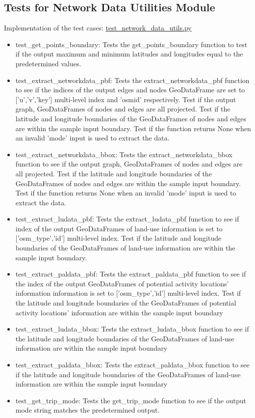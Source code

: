 \documentclass[12pt, titlepage]{article}
\begin{document}
\subsection{Tests for Network Data Utilities Module}
Implementation of the test cases: \href{https://github.com/paezha/PyERT-BLACK/blob/rev1-implementation/src/test_network_data_utils.py}{test\_network\_data\_utils.py} 
\begin{itemize}
    \item test\_get\_points\_boundary: Tests the get\_points\_boundary function to test if the output maximum and minimum latitudes and longitudes equal to the predetermined values.
    \item test\_extract\_networkdata\_pbf: Tests the extract\_networkdata\_pbf function to see if the indices of the output edges and nodes GeoDataFrame are set to ['u','v','key'] multi-level index and 'osmid' respectively. Test if the output graph, GeoDataFrames of nodes and edges are all projected. Test if the latitude and longitude boundaries of the GeoDataFrames of nodes and edges are within the sample input boundary. Test if the function returns None when an invalid 'mode' input is used to extract the data.
    \item test\_extract\_networkdata\_bbox: Tests the extract\_networkdata\_bbox function to see if the output graph, GeoDataFrames of nodes and edges are all projected. Test if the latitude and longitude boundaries of the GeoDataFrames of nodes and edges are within the sample input boundary. Test if the function returns None when an invalid 'mode' input is used to extract the data.
    \item test\_extract\_ludata\_pbf: Tests the extract\_ludata\_pbf function to see if index of the output GeoDataFrames of land-use information is set to ['osm\_type','id'] multi-level index. Test if the latitude and longitude boundaries of the GeoDataFrames of land-use information are within the sample input boundary. 
    \item test\_extract\_paldata\_pbf: Tests the extract\_paldata\_pbf function to see if the index of the output GeoDataFrames of potential activity locations' information information is set to ['osm\_type','id'] multi-level index. Test if the latitude and longitude boundaries of the GeoDataFrames of potential activity locations' information are within the sample input boundary
    \item test\_extract\_ludata\_bbox: Tests the extract\_ludata\_bbox function to see if the latitude and longitude boundaries of the GeoDataFrames of land-use information are within the sample input boundary
    \item test\_extract\_paldata\_bbox: Tests the extract\_paldata\_bbox function to see if the latitude and longitude boundaries of the GeoDataFrames of land-use information are within the sample input boundary
    \item test\_get\_trip\_mode: Tests the get\_trip\_mode function to see if the output mode string matches the predetermined output.
\end{itemize}
				
\end{document}
